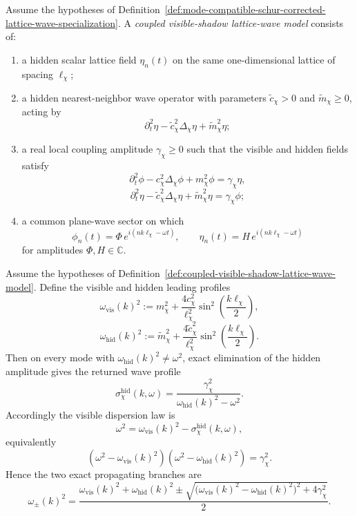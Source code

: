 \begin{definition}
\label{def:coupled-visible-shadow-lattice-wave-model}
Assume the hypotheses of
Definition~\ref{def:mode-compatible-schur-corrected-lattice-wave-specialization}.
A \emph{coupled visible-shadow lattice-wave model} consists of:
\begin{enumerate}[label=(\roman*),itemsep=0.2em]
\item a hidden scalar lattice field \(\eta_n(t)\) on the same one-dimensional
      lattice of spacing \(\ell_{\chi}\);
\item a hidden nearest-neighbor wave operator with parameters
      \(\widetilde c_{\chi}>0\) and \(\widetilde m_{\chi}\ge 0\), acting by
      \[
      \partial_t^2\eta
      -
      \widetilde c_{\chi}^2\Delta_{\chi}\eta
      +
      \widetilde m_{\chi}^2\eta;
      \]
\item a real local coupling amplitude \(\gamma_{\chi}\ge 0\) such that the
      visible and hidden fields satisfy
      \[
      \partial_t^2\phi
      -
      c_{\chi}^2\Delta_{\chi}\phi
      +
      m_{\chi}^2\phi
      =
      \gamma_{\chi}\eta,
      \]
      \[
      \partial_t^2\eta
      -
      \widetilde c_{\chi}^2\Delta_{\chi}\eta
      +
      \widetilde m_{\chi}^2\eta
      =
      \gamma_{\chi}\phi;
      \]
\item a common plane-wave sector on which
      \[
      \phi_n(t)=\Phi\,e^{i(nk\ell_{\chi}-\omega t)},
      \qquad
      \eta_n(t)=H\,e^{i(nk\ell_{\chi}-\omega t)}
      \]
      for amplitudes \(\Phi,H\in\mathbb C\).
\end{enumerate}
\end{definition}

\begin{theorem}
\label{thm:hidden-channel-wave-remainder-and-branch-splitting}
Assume the hypotheses of
Definition~\ref{def:coupled-visible-shadow-lattice-wave-model}. Define the
visible and hidden leading profiles
\[
\omega_{\mathrm{vis}}(k)^2
:=
m_{\chi}^2
+
\frac{4c_{\chi}^2}{\ell_{\chi}^2}
\sin^2\!\left(\frac{k\ell_{\chi}}{2}\right),
\]
\[
\omega_{\mathrm{hid}}(k)^2
:=
\widetilde m_{\chi}^2
+
\frac{4\widetilde c_{\chi}^2}{\ell_{\chi}^2}
\sin^2\!\left(\frac{k\ell_{\chi}}{2}\right).
\]
Then on every mode with \(\omega_{\mathrm{hid}}(k)^2\neq \omega^2\), exact
elimination of the hidden amplitude gives the returned wave profile
\[
\sigma_{\chi}^{\mathrm{hid}}(k,\omega)
=
\frac{\gamma_{\chi}^2}{\omega_{\mathrm{hid}}(k)^2-\omega^2}.
\]
Accordingly the visible dispersion law is
\[
\omega^2
=
\omega_{\mathrm{vis}}(k)^2
-
\sigma_{\chi}^{\mathrm{hid}}(k,\omega),
\]
equivalently
\[
(\omega^2-\omega_{\mathrm{vis}}(k)^2)
(\omega^2-\omega_{\mathrm{hid}}(k)^2)
=
\gamma_{\chi}^2.
\]
Hence the two exact propagating branches are
\[
\omega_{\pm}(k)^2
=
\frac{
\omega_{\mathrm{vis}}(k)^2+\omega_{\mathrm{hid}}(k)^2
\pm
\sqrt{
\bigl(\omega_{\mathrm{vis}}(k)^2-\omega_{\mathrm{hid}}(k)^2\bigr)^2
+
4\gamma_{\chi}^2
}
}{2}.
\]
\end{theorem}

